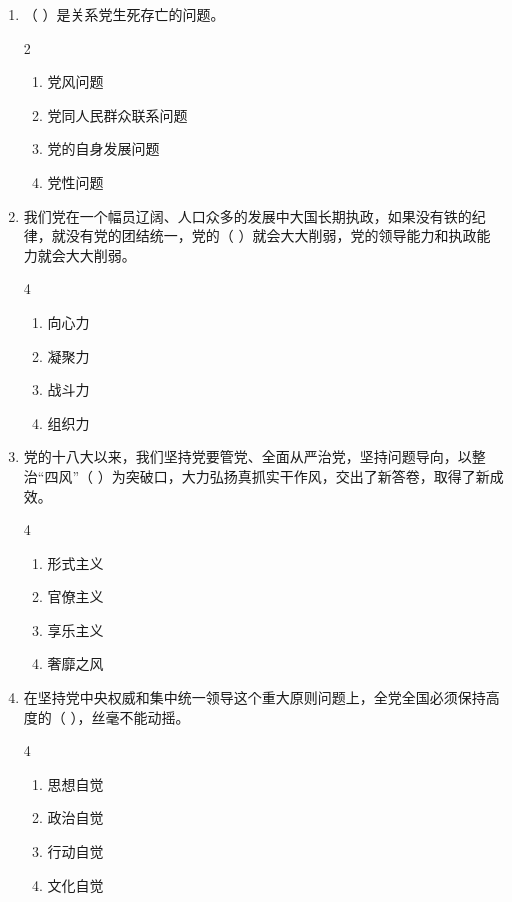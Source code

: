 \documentclass[a4paper,11pt]{ctexart}
\begin{document}
\begin{enumerate}
    \item （ ）是关系党生死存亡的问题。
    \begin{multicols}{2}
    \begin{enumerate}
        \item 党风问题
        \item 党同人民群众联系问题
        \item 党的自身发展问题
        \item 党性问题
    \end{enumerate}
    \end{multicols}

    \item 我们党在一个幅员辽阔、人口众多的发展中大国长期执政，如果没有铁的纪律，就没有党的团结统一，党的（ ）就会大大削弱，党的领导能力和执政能力就会大大削弱。
    \begin{multicols}{4}
    \begin{enumerate}
        \item 向心力
        \item 凝聚力
        \item 战斗力
        \item 组织力
    \end{enumerate}
    \end{multicols}

    \item 党的十八大以来，我们坚持党要管党、全面从严治党，坚持问题导向，以整治“四风”（ ）为突破口，大力弘扬真抓实干作风，交出了新答卷，取得了新成效。
    \begin{multicols}{4}
    \begin{enumerate}
        \item 形式主义
        \item 官僚主义
        \item 享乐主义
        \item 奢靡之风
    \end{enumerate}
    \end{multicols}

    \item 在坚持党中央权威和集中统一领导这个重大原则问题上，全党全国必须保持高度的（ ），丝毫不能动摇。
    \begin{multicols}{4}
    \begin{enumerate}
        \item 思想自觉
        \item 政治自觉
        \item 行动自觉
        \item 文化自觉
    \end{enumerate}
    \end{multicols}


\end{enumerate}
\end{document}
